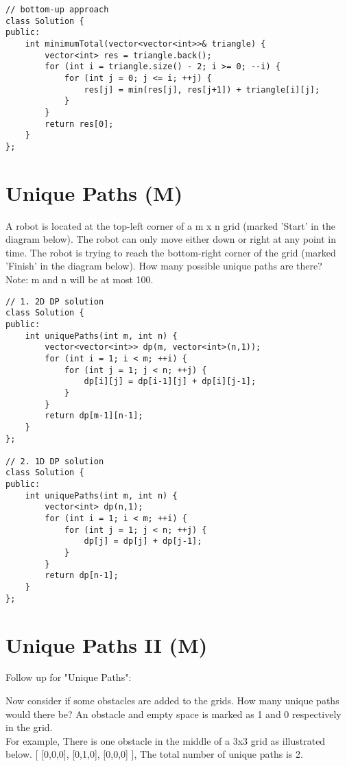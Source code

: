 \begin{lstlisting}
// bottom-up approach
class Solution {
public:
    int minimumTotal(vector<vector<int>>& triangle) {
        vector<int> res = triangle.back();
        for (int i = triangle.size() - 2; i >= 0; --i) {
            for (int j = 0; j <= i; ++j) {
                res[j] = min(res[j], res[j+1]) + triangle[i][j];
            }
        }
        return res[0];
    }
};
\end{lstlisting}


\section{Unique Paths (M)}
A robot is located at the top-left corner of a m x n grid (marked 'Start' in the diagram below). The robot can only move either down or right at any point in time. The robot is trying to reach the bottom-right corner of the grid (marked 'Finish' in the diagram below). How many possible unique paths are there?\\

Note: m and n will be at most 100.\\

\begin{lstlisting}
// 1. 2D DP solution
class Solution {
public:
    int uniquePaths(int m, int n) {
        vector<vector<int>> dp(m, vector<int>(n,1));
        for (int i = 1; i < m; ++i) {
            for (int j = 1; j < n; ++j) {
                dp[i][j] = dp[i-1][j] + dp[i][j-1];
            }
        }
        return dp[m-1][n-1];
    }
};

// 2. 1D DP solution
class Solution {
public:
    int uniquePaths(int m, int n) {
        vector<int> dp(n,1);
        for (int i = 1; i < m; ++i) {
            for (int j = 1; j < n; ++j) {
                dp[j] = dp[j] + dp[j-1];
            }
        }
        return dp[n-1];
    }
};
\end{lstlisting}


\section{Unique Paths II (M)}
Follow up for "Unique Paths":

Now consider if some obstacles are added to the grids. How many unique paths would there be? An obstacle and empty space is marked as 1 and 0 respectively in the grid.\\

For example, There is one obstacle in the middle of a 3x3 grid as illustrated below.
[
  [0,0,0],
  [0,1,0],
  [0,0,0]
], The total number of unique paths is 2.\\

